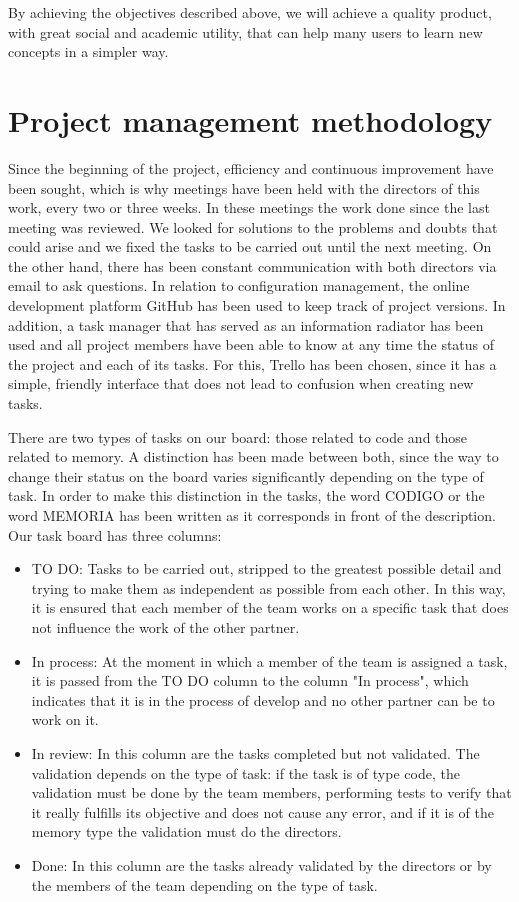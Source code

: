 By achieving the objectives described above, we will achieve a quality product, with great social and academic utility, that can help many users to learn new concepts in a simpler way.

\section{Project management methodology}
\label{sec:project_management}

Since the beginning of the project, efficiency and continuous improvement have been sought, which is why meetings have been held with the directors of this work, every two or three weeks. In these meetings the work done since the last meeting was reviewed. We looked for solutions to the problems and doubts that could arise and we fixed the tasks to be carried out until the next meeting. On the other hand, there has been constant communication with both directors via email to ask questions.
In relation to configuration management, the online development platform GitHub has been used to keep track of project versions. In addition, a task manager that has served as an information radiator has been used and all project members have been able to know at any time the status of the project and each of its tasks. For this, Trello has been chosen, since it has a simple, friendly interface that does not lead to confusion when creating new tasks.


There are two types of tasks on our board: those related to code and those related to memory. A distinction has been made between both, since the way to change their status on the board varies significantly depending on the type of task. In order to make this distinction in the tasks, the word CODIGO or the word MEMORIA has been written as it corresponds in front of the description. Our task board has three columns:

\begin{itemize}
	\item TO DO: Tasks to be carried out, stripped to the greatest possible detail and trying to make them as independent as possible from each other. In this way, it is ensured that each member of the team works on a specific task that does not influence the work of the other partner.
	\item In process: At the moment in which a member of the team is assigned a task, it is passed from the TO DO column to the column "In process", which indicates that it is in the process of develop and no other partner can be to work on it.
	\item In review: In this column are the tasks completed but not validated. The validation depends on the type of task: if the task is of type code, the validation must be done by the team members, performing tests to verify that it really fulfills its objective and does not cause any error, and if it is of the memory type the validation must do the directors.
	\item Done: In this column are the tasks already validated by the directors or by the members of the team depending on the type of task.
\end{itemize} 


